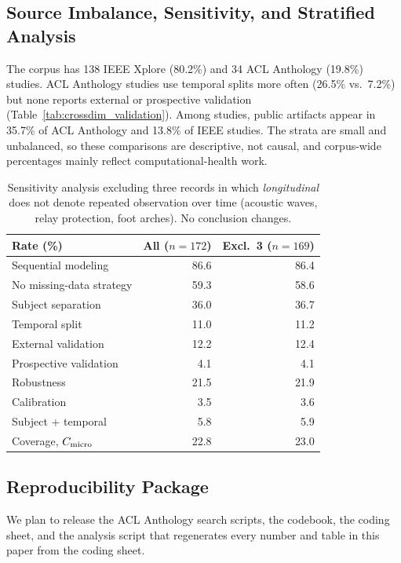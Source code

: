 \documentclass[11pt]{article}
\theoremstyle{plain}
\theoremstyle{definition}
\theoremstyle{remark}
\begin{document}
\subsection{Source Imbalance, Sensitivity, and Stratified Analysis}
\label{sec:appendix_source_analysis}
The corpus has 138 IEEE Xplore (80.2\%) and 34 ACL Anthology (19.8\%) studies. ACL Anthology studies use temporal splits more often (26.5\% vs.\ 7.2\%) but none reports external or prospective validation (Table~\ref{tab:crossdim_validation}). Among  studies, public artifacts appear in 35.7\% of ACL Anthology and 13.8\% of IEEE studies. The strata are small and unbalanced, so these comparisons are descriptive, not causal, and corpus-wide percentages mainly reflect computational-health work.

\begin{table}[!t]
\centering\footnotesize
\setlength{\tabcolsep}{3pt}
\begin{tabular*}{\columnwidth}{@{\extracolsep{\fill}}lrr@{}}
\toprule
\textbf{Rate (\%)} & \textbf{All} ($n{=}172$) & \textbf{Excl.\ 3} ($n{=}169$)\\
\midrule
Sequential modeling      & 86.6 & 86.4 \\
No missing-data strategy & 59.3 & 58.6 \\
Subject separation       & 36.0 & 36.7 \\
Temporal split           & 11.0 & 11.2 \\
External validation      & 12.2 & 12.4 \\
Prospective validation   & 4.1  & 4.1 \\
Robustness               & 21.5 & 21.9 \\
Calibration              & 3.5  & 3.6 \\
Subject + temporal       & 5.8  & 5.9 \\
Coverage, $C_{\rm micro}$ & 22.8 & 23.0 \\
\bottomrule
\end{tabular*}
\caption{Sensitivity analysis excluding three records in which \emph{longitudinal} does not denote repeated observation over time (acoustic waves, relay protection, foot arches). No conclusion changes.}
\label{tab:sensitivity}
\end{table}

\subsection{Reproducibility Package}
We plan to release the ACL Anthology search scripts, the codebook, the coding sheet, and the analysis script that regenerates every number and table in this paper from the coding sheet.
\end{document}
